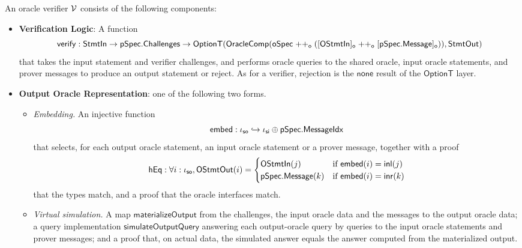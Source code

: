 \begin{definition}
    \label{def:oracle_verifier}
    An oracle verifier \(\mathcal{V}\) consists of the following components:

    \begin{itemize}
        \item \textbf{Verification Logic}: A function
        \begin{equation*} \mathsf{verify} : \mathsf{StmtIn} \to \mathsf{pSpec}.\mathsf{Challenges} \to \mathsf{OptionT}(\mathsf{OracleComp}(\mathsf{oSpec} \mathrel{++_\mathsf{o}} ([\mathsf{OStmtIn}]_\mathsf{o} \mathrel{++_\mathsf{o}} [\mathsf{pSpec}.\mathsf{Message}]_\mathsf{o})), \mathsf{StmtOut}) \end{equation*}
        that takes the input statement and verifier challenges, and performs oracle queries to the shared oracle, input oracle statements, and prover messages to produce an output statement or reject. As for a verifier, rejection is the \(\mathsf{none}\) result of the \(\mathsf{OptionT}\) layer.

        \item \textbf{Output Oracle Representation}: one of the following two forms.
        \begin{itemize}
            \item \emph{Embedding.} An injective function
            \begin{equation*} \mathsf{embed} : \iota_{\mathsf{so}} \hookrightarrow \iota_{\mathsf{si}} \oplus \mathsf{pSpec}.\mathsf{MessageIdx} \end{equation*}
            that selects, for each output oracle statement, an input oracle statement or a prover
            message, together with a proof
            \begin{equation*} \mathsf{hEq} : \forall i : \iota_{\mathsf{so}}, \mathsf{OStmtOut}(i) = \begin{cases}
                \mathsf{OStmtIn}(j) & \text{if } \mathsf{embed}(i) = \mathsf{inl}(j) \\
                \mathsf{pSpec}.\mathsf{Message}(k) & \text{if } \mathsf{embed}(i) = \mathsf{inr}(k)
            \end{cases} \end{equation*}
            that the types match, and a proof that the oracle interfaces match.
            \item \emph{Virtual simulation.} A map \(\mathsf{materializeOutput}\) from the
            challenges, the input oracle data and the messages to the output oracle data; a query
            implementation \(\mathsf{simulateOutputQuery}\) answering each output-oracle query by
            queries to the input oracle statements and prover messages; and a proof that, on actual
            data, the simulated answer equals the answer computed from the materialized output.
        \end{itemize}
    \end{itemize}
    \leanok
\end{definition}

